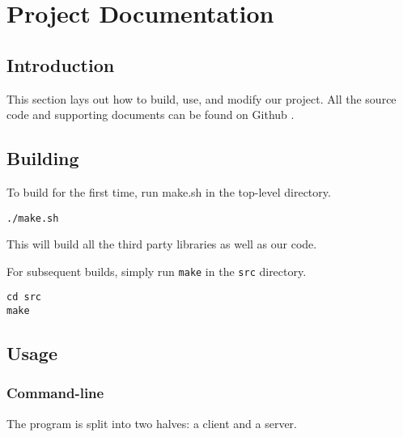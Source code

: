 \chapter{Project Documentation}



\section{Introduction}

This section lays out how to build, use, and modify our project.
All the source code and supporting documents can be found on Github \cite{Github}.

\section{Building}

To build for the first time, run make.sh in the top-level directory.

\begin{lstlisting}
./make.sh
\end{lstlisting}

This will build all the third party libraries as well as our code.

For subsequent builds, simply run \texttt{make} in the \texttt{src} directory.

\begin{lstlisting}
cd src
make
\end{lstlisting}

\section{Usage}

\subsection{Command-line}

The program is split into two halves: a client and a server.

